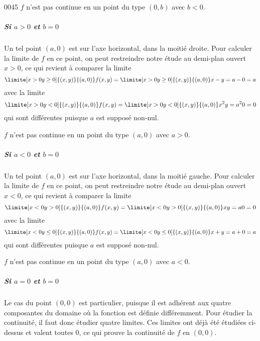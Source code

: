 \begin{corrige}{0045}
\conclusion $f$ n'est pas continue en un point du type $(0,b)$ avec $b
< 0$.

\subparagraph{Si $a > 0$ et $b = 0$} Un tel point $(a,0)$ est sur
l'axe horizontal, dans la moitié droite. Pour calculer la limite de
$f$ en ce point, on peut restreindre notre étude au demi-plan ouvert
$x > 0$, ce qui revient à comparer la limite
\begin{equation*}
  \limite[x>0\\y \geq 0] {(x,y)} {(a,0)} f(x,y) =   \limite[x>0\\y \geq
  0] {(x,y)} {(a,0)} x-y = a - 0 = a
\end{equation*}
avec la limite
\begin{equation*}
  \limite[x>0\\y < 0] {(x,y)} {(a,0)} f(x,y) =   \limite[x>0\\y < 0]
  {(x,y)} {(a,0)} x^2y = a^2 0 = 0
\end{equation*}
qui sont différentes puisque $a$ est supposé non-nul.

\conclusion $f$ n'est pas continue en un point du type $(a,0)$ avec $a
> 0$.

\subparagraph{Si $a < 0$ et $b = 0$} Un tel point $(a,0)$ est sur
l'axe horizontal, dans la moitié gauche. Pour calculer la limite de
$f$ en ce point, on peut restreindre notre étude au demi-plan ouvert
$x < 0$, ce qui revient à comparer la limite
\begin{equation*}
  \limite[x<0\\y> 0] {(x,y)} {(a,0)} f(x,y) =   \limite[x<0\\y>
  0] {(x,y)} {(a,0)} x y = a 0 = 0
\end{equation*}
avec la limite
\begin{equation*}
  \limite[x<0\\y\leq 0] {(x,y)} {(a,0)} f(x,y) =   \limite[x<0\\y\leq0]
  {(x,y)} {(a,0)} x+y = a + 0 = a
\end{equation*}
qui sont différentes puisque $a$ est supposé non-nul.

\conclusion $f$ n'est pas continue en un point du type $(a,0)$ avec $a
< 0$.

\subparagraph{Si $a = 0$ et $b = 0$} Le cas du point $(0,0)$ est
particulier, puisque il est adhérent aux quatre composantes du
domaine où la fonction est définie différemment. Pour étudier la
continuité, il faut donc étudier quatre limites. Ces limites ont déjà
été étudiées ci-dessus et valent toutes $0$, ce qui prouve la
continuité de $f$ en $(0,0)$.


\end{corrige}

